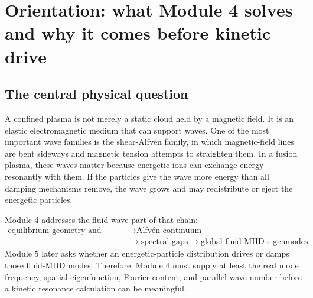 \section{Orientation: what Module 4 solves and why it comes before kinetic drive}
\label{sec:orientation}

\subsection{The central physical question}
A confined plasma is not merely a static cloud held by a magnetic field. It is an elastic electromagnetic medium that can support waves. One of the most important wave families is the shear-Alfv\'en family, in which magnetic-field lines are bent sideways and magnetic tension attempts to straighten them. In a fusion plasma, these waves matter because energetic ions can exchange energy resonantly with them. If the particles give the wave more energy than all damping mechanisms remove, the wave grows and may redistribute or eject the energetic particles.

Module 4 addresses the fluid-wave part of that chain:
\begin{equation}
\boxed{\begin{aligned}
\text{equilibrium geometry and density}
&\longrightarrow \text{Alfv\'en continuum}\\
&\longrightarrow \text{spectral gaps}
\longrightarrow \text{global fluid-MHD eigenmodes}
\end{aligned}}
\end{equation}
Module 5 later asks whether an energetic-particle distribution drives or damps those fluid-MHD modes. Therefore, Module 4 must supply at least the real mode frequency, spatial eigenfunction, Fourier content, and parallel wave number before a kinetic resonance calculation can be meaningful.


